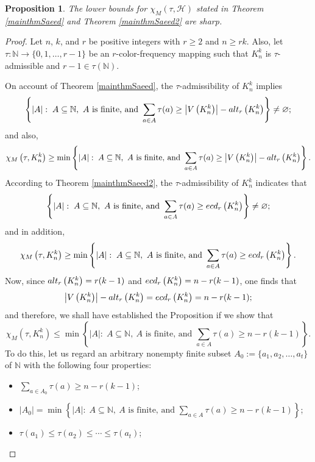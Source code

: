 \documentclass[11pt]{amsart}
\newtheorem{proposition}{Proposition}
\theoremstyle{definition}
\begin{document}
\begin{proposition}
	The lower bounds for $\chi_M(\tau,{\mathcal H})$ stated in Theorem \ref{mainthmSaeed} and Theorem \ref{mainthmSaeed2} are sharp.
\end{proposition}
\begin{proof}
	Let $n$, $k$, and $r$ be positive integers with $r\geq 2$ and
	$n\geq rk$. Also, let $\tau:\mathbb{N}\longrightarrow \{0,1,\ldots,r-1\}$
	be an $r$-color-frequency mapping such that $K_n^k$ is $\tau$-admissible and $r-1\in\tau(\mathbb{N})$.
	
	On account of Theorem \ref{mainthmSaeed}, the $\tau$-admissibility of $K_n^k$ implies
	$$\left\{|A|:\; A\subseteq \mathbb{N},\ A \mbox{ is finite, and } \sum_{a\in A}\tau(a) \geq  \left|V\left(K_n^k\right)\right|-{\rm alt}_r\left(K_n^k\right)\right\} \neq \varnothing ;$$
	and also,
	$$\chi_M\left(\tau,K_n^k\right) \geq \min \left\{|A|:\; A\subseteq \mathbb{N},\ A \mbox{ is finite, and } \sum_{a\in A}\tau(a) \geq  \left|V\left(K_n^k\right)\right|-{\rm alt}_r\left(K_n^k\right)\right\} .$$
	According to Theorem \ref{mainthmSaeed2}, the $\tau$-admissibility of $K_n^k$ indicates that
	$$\left\{|A|:\; A\subseteq \mathbb{N},\ A \mbox{ is finite, and } \sum_{a\in A}\tau(a) \geq  {\rm ecd}_r\left(K_n^k\right)\right\} \neq \varnothing ;$$
	and in addition,
	$$\chi_M\left(\tau,K_n^k\right) \geq \min \left\{|A|:\; A\subseteq \mathbb{N},\ A \mbox{ is finite, and } \sum_{a\in A}\tau(a) \geq  {\rm ecd}_r\left(K_n^k\right)\right\} .$$
	Now, since ${\rm alt}_r\left(K_n^k\right)= r(k-1)$ and ${\rm ecd}_r\left(K_n^k\right)= n - r(k-1)$,
	one finds that
	$$\left|V\left(K_n^k\right)\right|-{\rm alt}_r\left(K_n^k\right) = {\rm ecd}_r\left(K_n^k\right)= n - r(k-1) ;$$
	and therefore, we shall have established the Proposition if we show that
	$$\chi_M\left(\tau,K_n^k\right)\leq \min \left\{|A|:\; A\subseteq \mathbb{N},\ A \mbox{ is finite, and } \sum_{a\in A}\tau(a) \geq  n-r(k-1)\right\} .$$
	To do this, let us regard an arbitrary nonempty finite subset $A_0:=\{a_1,a_2,\ldots,a_t\}$ of $\mathbb{N}$ with the following four properties:
	\begin{itemize}
		\item $\displaystyle\sum_{a\in A_0}\tau(a) \geq  n-r(k-1) $; \\
		\item $\left| A_0 \right| = \min \left\{|A|:\; A\subseteq \mathbb{N},\ A \mbox{ is finite, and } \displaystyle\sum_{a\in A}\tau(a) \geq  n-r(k-1)\right\} $; \\
		\item $\tau(a_{1})\leq\tau(a_{2})\leq\cdots\leq\tau(a_{t})$; \\

\end{itemize}
\end{proof}
\end{document}
